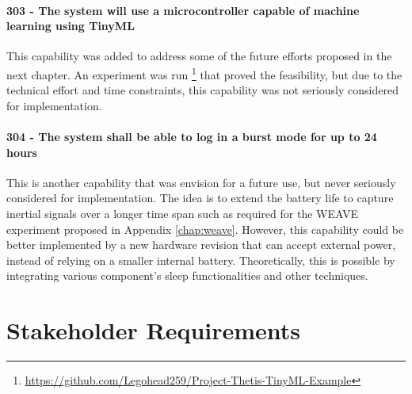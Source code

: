 \paragraph*{303 - The system will use a microcontroller capable of machine learning using TinyML} This capability was added to address some of the future efforts proposed in the next chapter.
An experiment was run \footnote{\url{https://github.com/Legohead259/Project-Thetis-TinyML-Example}} that proved the feasibility, but due to the technical effort and time constraints, this capability was not seriously considered for implementation.

\paragraph*{304 - The system shall be able to log in a burst mode for up to 24 hours} This is another capability that was envision for a future use, but never seriously considered for implementation.
The idea is to extend the battery life to capture inertial signals over a longer time span such as required for the WEAVE experiment proposed in Appendix \ref{chap:weave}.
However, this capability could be better implemented by a new hardware revision that can accept external power, instead of relying on a smaller internal battery.
Theoretically, this is possible by integrating various component's sleep functionalities and other techniques.

\section{Stakeholder Requirements}

